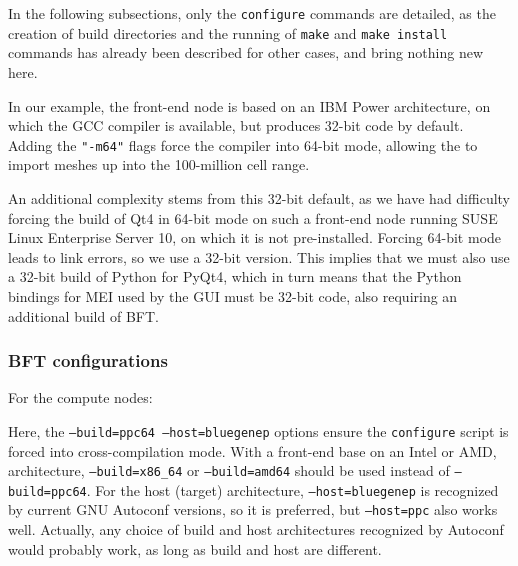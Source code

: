 \documentclass[a4paper,10pt,twoside]{article}
\begin{document}
In the following subsections, only the \texttt{configure} commands are
detailed, as the creation of build directories and the running of
\texttt{make} and \texttt{make install} commands has already
been described for other cases, and bring nothing new here.

In our example, the front-end node is based on an IBM Power architecture,
on which the GCC compiler is available, but produces 32-bit code by default.
Adding the \texttt{"-m64"} flags force the compiler into 64-bit mode, allowing
the \pcs to import meshes up into the 100-million cell range.

An additional complexity stems from this 32-bit default, as we have
had difficulty forcing the build of Qt4 in 64-bit mode on such
a front-end node running SUSE Linux Enterprise Server 10, on which
it is not pre-installed. Forcing 64-bit mode leads to link errors,
so we use a 32-bit version. This implies that we must also use a
32-bit build of Python for PyQt4, which in turn means that the Python
bindings for MEI used by the GUI must be 32-bit code,
also requiring an additional build of BFT.

\subsubsection{BFT configurations}

For the compute nodes:


Here, the \texttt{--build=ppc64 --host=bluegenep} options ensure the
\texttt{configure} script is forced into cross-compilation mode.
With a front-end base on an Intel or AMD, architecture,
\texttt{--build=x86\_64} or \texttt{--build=amd64} should be used
instead of \texttt{--build=ppc64}. For the host (target) architecture,
\texttt{--host=bluegenep} is recognized by current GNU Autoconf versions,
so it is preferred, but \texttt{--host=ppc} also works well. Actually,
any choice of build and host architectures recognized by Autoconf would
probably work, as long as build and host are different.
\end{document}
